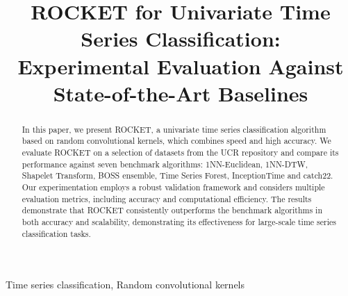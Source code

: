 \documentclass[conference]{IEEEtran}
\title{ROCKET for Univariate Time Series Classification:\\
Experimental Evaluation Against State-of-the-Art Baselines}
\author{
\IEEEauthorblockN{Alessandro, Anton, Lara, Iñigo}
\IEEEauthorblockA{Faculty of Informatics / UPV\\
San Sebastián, Spain\\}
}
\begin{document}
\maketitle

\begin{abstract}
In this paper, we present ROCKET, a univariate time series classification algorithm based on random convolutional kernels, which combines speed and high accuracy. We evaluate ROCKET on a selection of datasets from the UCR repository and compare its performance against seven benchmark algorithms: 1NN-Euclidean, 1NN-DTW, Shapelet Transform, BOSS ensemble, Time Series Forest, InceptionTime and catch22. Our experimentation employs a robust validation framework and considers multiple evaluation metrics, including accuracy and computational efficiency. The results demonstrate that ROCKET consistently outperforms the benchmark algorithms in both accuracy and scalability, demonstrating its effectiveness for large-scale time series classification tasks.
\end{abstract}

\begin{IEEEkeywords}
Time series classification, Random convolutional kernels
\end{IEEEkeywords}










\end{document}
